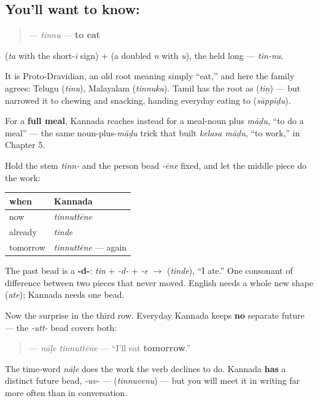 \subsection*{You'll want to know: }
\begin{quote}
\textbf{} — \emph{tinnu} — \textbf{to eat}
\end{quote}

\textbf{} (\emph{ta} with the short-\emph{i} sign) + \textbf{} (a doubled \emph{n} with \emph{u}), the \textbf{} held long — \emph{tin-nu}.

It is Proto-Dravidian, an old root meaning simply \textquotedblleft{}eat,\textquotedblright{} and here the family agrees: Telugu \textbf{} (\emph{tinu}), Malayalam \textbf{} (\emph{tinnuka}). Tamil has the root as \textbf{} (\emph{tiṉ}) — but narrowed it to chewing and snacking, handing everyday eating to \textbf{} (\emph{sāppiḍu}).

For a \textbf{full meal}, Kannada reaches instead for a meal-noun plus \emph{māḍu}, \textquotedblleft{}to do a meal\textquotedblright{} — the same noun-plus-\emph{māḍu} trick that built \emph{kelasa māḍu}, \textquotedblleft{}to work,\textquotedblright{} in Chapter 5.

\begin{grammarlens}[title={Grammar Lens: one bead for the past, and a future that never separated}]
Hold the stem \emph{tinn-} and the person bead \emph{-ēne} fixed, and let the middle piece do the work:

\noindent
\begin{tabularx}{\linewidth}{@{}>{\raggedright\arraybackslash}X>{\raggedright\arraybackslash}X@{}}
\toprule
\textbf{when} & \textbf{Kannada} \\
\midrule
now & \emph{tinnuttēne} \\
already & \emph{tinde} \\
tomorrow & \emph{tinnuttēne} — again \\
\bottomrule
\end{tabularx}

The past bead is a \textbf{-d-}: \emph{tin} + \emph{-d-} + \emph{-e} $\to$ \textbf{} (\emph{tinde}), \textquotedblleft{}I ate.\textquotedblright{} One consonant of difference between two pieces that never moved. English needs a whole new shape (\emph{ate}); Kannada needs one bead.

Now the surprise in the third row. Everyday Kannada keeps \textbf{no} separate future — the \emph{-utt-} bead covers both:

\begin{quote}
\textbf{ } — \emph{nāḷe tinnuttēne} — \textquotedblleft{}I'll eat \textbf{tomorrow}.\textquotedblright{}
\end{quote}

The time-word \emph{nāḷe} does the work the verb declines to do. Kannada \textbf{has} a distinct future bead, \emph{-uv-} — \textbf{} (\emph{tinnuvenu}) — but you will meet it in writing far more often than in conversation.
\end{grammarlens}

